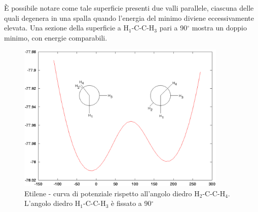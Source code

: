 \`E possibile notare come tale superficie presenti due valli parallele,
ciascuna delle quali degenera in una spalla quando l'energia del minimo
diviene eccessivamente elevata. Una sezione della superficie a 
H$_1$-C-C-H$_3$ pari a 90$^{\circ}$ mostra un doppio minimo, con energie comparabili. 
\begin{figure}[ht]
\begin{center}
\includegraphics[angle=0,width=10cm,keepaspectratio]{immagini/etene/c090.eps}
\caption{\small Etilene - curva di potenziale rispetto all'angolo diedro
H$_2$-C-C-H$_4$. L'angolo diedro H$_1$-C-C-H$_3$ \`e fissato a 90$^{\circ}$}
\label{fig:etene_c090}
\end{center}
\end{figure}

